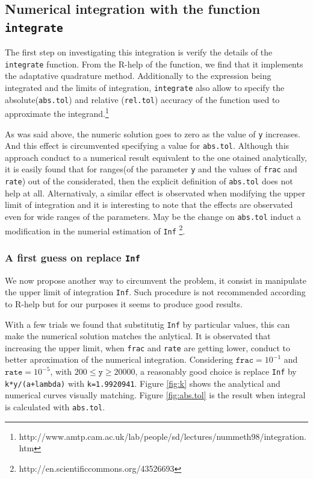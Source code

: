 \documentclass{article}
\newcommand{\code}[1]{\texttt{#1}}
\begin{document}
\subsection*{Numerical integration with the function \code{integrate}}

The first step on investigating this integration is verify the details of the \code{integrate} function. 
From the R-help of the function, we find that it implements the adaptative quadrature method. Additionally to the 
expression being integrated and the limits of integration, \code{integrate} also allow to specify the absolute(\code{abs.tol}) and relative 
(\code{rel.tol}) accuracy of the function used to approximate the integrand.\footnote{
http://www.amtp.cam.ac.uk/lab/people/sd/lectures/nummeth98/integration.htm}

As was said above, the numeric solution goes to zero as the value of \code{y} increases. And this effect is circumvented specifying a value 
for \code{abs.tol}. Although this approach conduct to a numerical result equivalent to the one otained analytically, it is easily found that for ranges(of the parameter  \code{y} and the values of \code{frac} and \code{rate}) out of the considerated, then the explicit definition of \code{abs.tol} does not help at all. Alternativaly, a similar effect is observated when modifying the upper limit of integration and it is interesting to note that the effects are observated even for wide ranges of the parameters. May be the change on \code{abs.tol} induct a modification in the numerial estimation of \code{Inf}  \footnote{http://en.scientificcommons.org/43526693}.

\subsubsection*{A first guess on replace \code{Inf}}

We now propose another way to circumvent the problem, it consist in manipulate the upper limit of integration \code{Inf}. Such procedure is not recommended according to R-help but for our purposes it seems to produce good results.

With a few trials we found that substitutig \code{Inf} by particular values, this can make the numerical solution matches the anlytical. It is observated that increasing the upper limit, when \code{frac} and \code{rate} are getting lower,  conduct to better aproximation of the numerical integration. Considering $\code{frac}=10^{-1}$ and $\code{rate}=10^{-5}$, with $200 \leq \code{y} \geq 20000$, a reasonably good choice is replace \code{Inf} by \code{k*y/(a+lambda)} with \code{k=1.9920941}. Figure \ref{fig:k} shows the analytical and numerical curves visually matching. Figure \ref{fig:abs.tol} is the result when integral is calculated with \code{abs.tol}.
\end{document}
